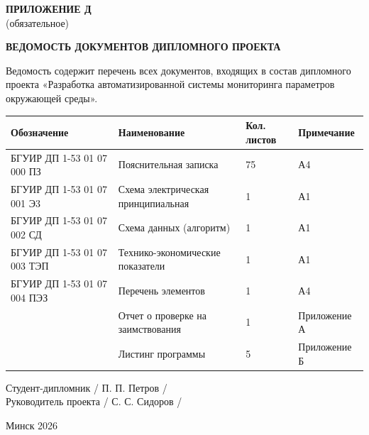 \newpage
\begin{flushright}
    {\bfseries ПРИЛОЖЕНИЕ Д} \\
    (обязательное)
\end{flushright}

\begin{center}
    {\bfseries ВЕДОМОСТЬ ДОКУМЕНТОВ ДИПЛОМНОГО ПРОЕКТА}
\end{center}


\vspace{0.5cm}

\noindent Ведомость содержит перечень всех документов, входящих в состав дипломного проекта «Разработка автоматизированной системы мониторинга параметров окружающей среды».

\vspace{0.5cm}

\begin{center}
\begin{tabular}{|p{4cm}|p{7.5cm}|p{1.5cm}|p{2cm}|}
\hline
\centering \textbf{Обозначение} & \centering \textbf{Наименование} & \centering \textbf{Кол. листов} & \textbf{Примечание} \\ \hline
БГУИР ДП 1-53 01 07 000 ПЗ & Пояснительная записка & 75 & А4 \\ \hline
БГУИР ДП 1-53 01 07 001 Э3 & Схема электрическая принципиальная & 1 & А1 \\ \hline
БГУИР ДП 1-53 01 07 002 СД & Схема данных (алгоритм) & 1 & А1 \\ \hline
БГУИР ДП 1-53 01 07 003 ТЭП & Технико-экономические показатели & 1 & А1 \\ \hline
БГУИР ДП 1-53 01 07 004 ПЭЗ & Перечень элементов & 1 & А4 \\ \hline
& Отчет о проверке на заимствования & 1 & Приложение А \\ \hline
& Листинг программы & 5 & Приложение Б \\ \hline
\end{tabular}
\end{center}

\vspace{1cm}

\begin{flushleft}
    Студент-дипломник \underline{\hspace{4cm}} / П. П. Петров / \\
    \vspace{0.3cm}
    Руководитель проекта \underline{\hspace{4cm}} / С. С. Сидоров /
\end{flushleft}

\vfill
\begin{center}
    Минск 2026
\end{center}

\newpage